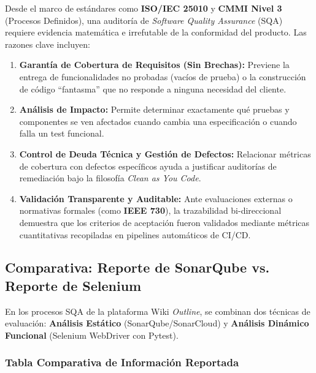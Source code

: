 \documentclass[12pt, letterpaper]{article}
\begin{document}
\begin{tcolorbox}[colback=gray!5,colframe=blue!50!black,boxrule=1pt,arc=2mm,title=\textbf{¿Por qué una Auditoría de Calidad exige esta Trazabilidad?}]
Desde el marco de estándares como \textbf{ISO/IEC 25010} y \textbf{CMMI Nivel 3} (Procesos Definidos), una auditoría de \textit{Software Quality Assurance} (SQA) requiere evidencia matemática e irrefutable de la conformidad del producto. Las razones clave incluyen:
\begin{enumerate}[leftmargin=*]
    \item \textbf{Garantía de Cobertura de Requisitos (Sin Brechas):} Previene la entrega de funcionalidades no probadas (vacíos de prueba) o la construcción de código \enquote{fantasma} que no responde a ninguna necesidad del cliente.
    \item \textbf{Análisis de Impacto:} Permite determinar exactamente qué pruebas y componentes se ven afectados cuando cambia una especificación o cuando falla un test funcional.
    \item \textbf{Control de Deuda Técnica y Gestión de Defectos:} Relacionar métricas de cobertura con defectos específicos ayuda a justificar auditorías de remediación bajo la filosofía \textit{Clean as You Code}.
    \item \textbf{Validación Transparente y Auditable:} Ante evaluaciones externas o normativas formales (como \textbf{IEEE 730}), la trazabilidad bi-direccional demuestra que los criterios de aceptación fueron validados mediante métricas cuantitativas recopiladas en pipelines automáticos de CI/CD.
\end{enumerate}
\end{tcolorbox}

\subsection{Comparativa: Reporte de SonarQube vs. Reporte de Selenium}

En los procesos SQA de la plataforma Wiki \textit{Outline}, se combinan dos técnicas de evaluación: \textbf{Análisis Estático} (SonarQube/SonarCloud) y \textbf{Análisis Dinámico Funcional} (Selenium WebDriver con Pytest).

\subsubsection{Tabla Comparativa de Información Reportada}
\end{document}
